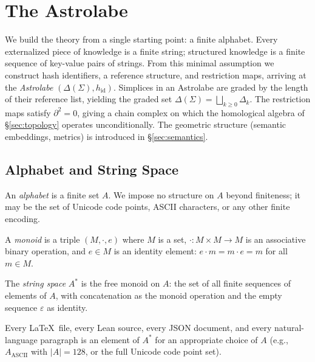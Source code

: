 \section{The Astrolabe}
\label{sec:foundations}

We build the theory from a single starting point: a finite alphabet. Every externalized piece of knowledge is a finite string; structured knowledge is a finite sequence of key-value pairs of strings. From this minimal assumption we construct hash identifiers, a reference structure, and restriction maps, arriving at the \emph{Astrolabe} $(\Delta(\Sigma), h_{\mathrm{id}})$. Simplices in an Astrolabe are graded by the length of their reference list, yielding the graded set $\Delta(\Sigma) = \bigsqcup_{k \geq 0} \Delta_k$. The restriction maps satisfy $\partial^2 = 0$, giving a chain complex on which the homological algebra of \S\ref{sec:topology} operates unconditionally. The geometric structure (semantic embeddings, metrics) is introduced in \S\ref{sec:semantics}.

\subsection{Alphabet and String Space}

\begin{definition}[Alphabet]
\label{def:alphabet}
An \emph{alphabet} is a finite set $A$. We impose no structure on $A$ beyond finiteness; it may be the set of Unicode code points, ASCII characters, or any other finite encoding.
\end{definition}

\begin{definition}[Monoid]
\label{def:monoid}
A \emph{monoid} is a triple $(M, \cdot, e)$ where $M$ is a set, $\cdot : M \times M \to M$ is an associative binary operation, and $e \in M$ is an identity element: $e \cdot m = m \cdot e = m$ for all $m \in M$.
\end{definition}

\begin{definition}
\label{def:string-space}
The \emph{string space} $A^*$ is the free monoid on $A$: the set of all finite sequences of elements of $A$, with concatenation as the monoid operation and the empty sequence $\varepsilon$ as identity.
\end{definition}

Every \LaTeX\ file, every Lean source, every JSON document, and every natural-language paragraph is an element of $A^*$ for an appropriate choice of $A$ (e.g., $A_{\mathrm{ASCII}}$ with $|A| = 128$, or the full Unicode code point set).

